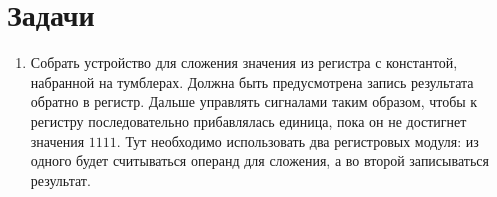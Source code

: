 \section{Задачи}

\begin{enumerate}
    \item Собрать устройство для сложения значения из регистра с константой, набранной на тумблерах.
          Должна быть предусмотрена запись результата обратно в регистр.
          Дальше управлять сигналами таким образом, чтобы к регистру последовательно
          прибавлялась единица, пока он не достигнет значения $1111$.
          Тут необходимо использовать два регистровых модуля: из одного будет считываться операнд для сложения,
          а во второй записываться результат.
\end{enumerate}
